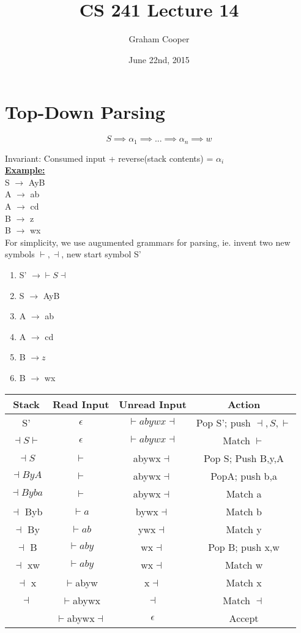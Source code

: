 \documentclass[12pt]{article}
\title{\vspace{-15ex}CS 241 Lecture 14\vspace{-1ex}}
\date{June 22nd, 2015}
\author{Graham Cooper}
\newcommand{\myt}[1]{\textbf{\underline{#1}}}
\begin{document}
	\maketitle
	
	\section*{Top-Down Parsing}
	
	$$S \implies \alpha_1 \implies ... \implies \alpha_n \implies w$$
	
	Invariant: Consumed input + reverse(stack contents) = $\alpha_i$\\
	
	\myt{Example:}\\
	S $\rightarrow$ AyB\\
	A $\rightarrow$ ab\\
	A $\rightarrow$ cd\\
	B $\rightarrow$ z\\
	B $\rightarrow$ wx\\
	
	For simplicity, we use augumented grammars for parsing, ie. invent two new symbols $\vdash, \dashv$, new start symbol S'\\
	
	\begin{enumerate}
		\item S' $\rightarrow \vdash S \dashv$
		\item S $\rightarrow$ AyB
		\item A $\rightarrow$ ab
		\item A $\rightarrow$ cd
		\item B $\rightarrow z$
		\item B $\rightarrow$ wx
	\end{enumerate}
	
	\begin{tabular}{c | c | c | c }
		Stack & Read Input & Unread Input & Action \\ \hline
		S' & $\epsilon$ & $\vdash abywx \dashv$ & Pop S'; push $\dashv, S, \vdash$ \\
		$\dashv S \vdash$ & $\epsilon$ & $\vdash abywx \dashv$ & Match $\vdash$\\
		$\dashv S$ & $\vdash$ & abywx$\dashv$ & Pop S; Push B,y,A\\
		$\dashv ByA$ & $\vdash$ & abywx$\dashv$ & PopA; push b,a\\
		$\dashv Byba$ & $\vdash$ & abywx$\dashv$ & Match a \\
		$\dashv$ Byb & $\vdash a$ & bywx$\dashv$ &  Match b\\
		$\dashv$ By & $\vdash ab$ & ywx$\dashv$ & Match y\\
		$\dashv$ B & $\vdash aby$ & wx$\dashv$ & Pop B; push x,w\\
		$\dashv$ xw & $\vdash aby$ & wx$\dashv$ & Match w \\
		$\dashv$ x & $\vdash$abyw & x$\dashv$ & Match x \\
		$\dashv$ & $\vdash$abywx & $\dashv$ & Match $\dashv$\\
		& $\vdash$abywx$\dashv$ & $\epsilon$ & Accept\\ 
	\end{tabular}
\end{document}
